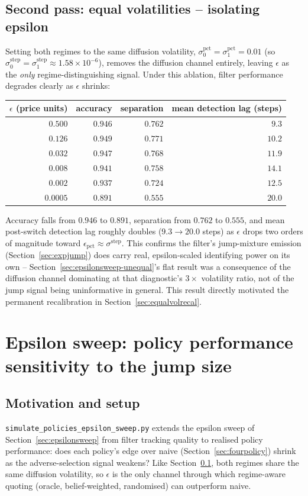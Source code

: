 \documentclass[11pt]{article}
\begin{document}
\subsection{Second pass: equal volatilities -- isolating epsilon}
\label{sec:epsilonsweep-equal}
Setting both regimes to the same diffusion volatility, $\sigma_0^{\text{pct}}=\sigma_1^{\text{pct}}=0.01$ (so $\sigma_0^{\text{step}}=\sigma_1^{\text{step}}\approx1.58\times10^{-6}$), removes the diffusion channel entirely, leaving $\epsilon$ as the \emph{only} regime-distinguishing signal. Under this ablation, filter performance degrades clearly as $\epsilon$ shrinks:
\begin{center}
\begin{tabular}{@{}rrrr@{}}
\toprule
$\epsilon$ (price units) & accuracy & separation & mean detection lag (steps) \\
\midrule
$0.500$ & $0.946$ & $0.762$ & $9.3$ \\
$0.126$ & $0.949$ & $0.771$ & $10.2$ \\
$0.032$ & $0.947$ & $0.768$ & $11.9$ \\
$0.008$ & $0.941$ & $0.758$ & $14.1$ \\
$0.002$ & $0.937$ & $0.724$ & $12.5$ \\
$0.0005$ & $0.891$ & $0.555$ & $20.0$ \\
\bottomrule
\end{tabular}
\end{center}
Accuracy falls from $0.946$ to $0.891$, separation from $0.762$ to $0.555$, and mean post-switch detection lag roughly doubles ($9.3\to20.0$ steps) as $\epsilon$ drops two orders of magnitude toward $\epsilon_{\text{pct}}\approx\sigma^{\text{step}}$. This confirms the filter's jump-mixture emission (Section~\ref{sec:expjump}) does carry real, epsilon-scaled identifying power on its own -- Section~\ref{sec:epsilonsweep-unequal}'s flat result was a consequence of the diffusion channel dominating at that diagnostic's $3\times$ volatility ratio, not of the jump signal being uninformative in general. This result directly motivated the permanent recalibration in Section~\ref{sec:equalvolrecal}.

\section{Epsilon sweep: policy performance sensitivity to the jump size}
\label{sec:policyepsilonsweep}

\subsection{Motivation and setup}
\texttt{simulate\_policies\_epsilon\_sweep.py} extends the epsilon sweep of Section~\ref{sec:epsilonsweep} from filter tracking quality to realised policy performance: does each policy's edge over naive (Section~\ref{sec:fourpolicy}) shrink as the adverse-selection signal weakens? Like Section~\ref{sec:epsilonsweep-equal}, both regimes share the same diffusion volatility, so $\epsilon$ is the only channel through which regime-aware quoting (oracle, belief-weighted, randomised) can outperform naive.
\end{document}

